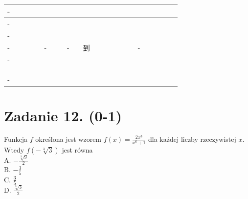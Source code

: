 \documentclass[10pt]{article}
\begin{document}
\begin{center}
\begin{tabular}{|c|c|c|c|c|c|c|c|c|c|c|c|c|c|c|c|c|c|c|c|c|c|c|}
\hline
- &  &  &  &  &  &  &  &  &  &  &  &  &  &  &  &  &  &  &  &  &  &  \\
\hline
- &  &  &  &  &  &  &  &  &  &  &  &  &  &  &  &  &  &  &  &  &  &  \\
\hline
- &  &  &  &  &  &  &  &  &  &  &  &  &  &  &  &  &  &  &  &  &  &  \\
\hline
- &  &  &  &  & - &  &  & - &  & 到 &  &  &  &  &  &  & - &  &  &  &  &  \\
\hline
- &  &  &  &  &  &  &  &  &  &  &  &  &  &  &  &  &  &  &  &  &  &  \\
\hline
 &  &  &  &  &  &  &  &  &  &  &  &  &  &  &  &  &  &  &  &  &  &  \\
\hline
 &  &  &  &  &  &  &  &  &  &  &  &  &  &  &  &  &  &  &  &  &  &  \\
\hline
 &  &  &  &  &  &  &  &  &  &  &  &  &  &  &  &  &  &  &  &  &  &  \\
\hline
- &  &  &  &  &  &  &  &  &  &  &  &  &  &  &  &  &  &  &  &  &  &  \\
\hline
\end{tabular}
\end{center}

\section*{Zadanie 12. (0-1)}
Funkcja \(f\) określona jest wzorem \(f(x)=\frac{2 x^{3}}{x^{6}+1}\) dla każdej liczby rzeczywistej \(x\). Wtedy \(f(-\sqrt[3]{3})\) jest równa\\
A. \(-\frac{\sqrt[3]{9}}{2}\)\\
B. \(-\frac{3}{5}\)\\
C. \(\frac{3}{5}\)\\
D. \(\frac{\sqrt[3]{3}}{2}\)
\end{document}
